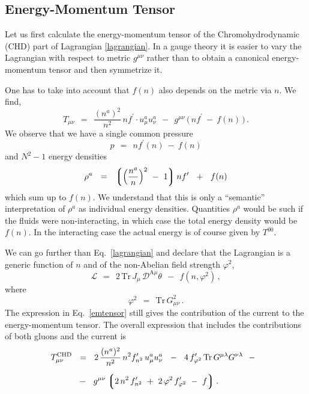\documentclass[epsfig,12pt]{article}
\def\beq{\begin{equation}}
\def\eeq{\end{equation}}
\newcommand{\md}{\mathcal{D}}
\newcommand{\ml}{\mathcal{L}}
\newcommand{\lgr}{\left\lgroup}
\newcommand{\rgr}{\right\rgroup}
\newcommand{\Tr}{\text{Tr}}
\begin{document}
\subsection{Energy-Momentum Tensor}
	Let us first calculate the energy-momentum tensor of the Chromohydrodynamic (CHD) part of Lagrangian \eqref{lagrangian}.
	In a gauge theory it is easier to vary the Lagrangian with respect to metric $ g^{\mu\nu} $ rather than to obtain
	a canonical energy-momentum tensor and then symmetrize it.

	One has to take into account that $ f(n) $ also depends on the metric via $ n $.
	We find,
\beq
\label{emtensor}
	T_{\mu\nu}    ~~=~~
				\frac{(n^a)^2}{n^2}\, n f^\prime \cdot u_\mu^a u_\nu^a  ~~-~~
				g^{\mu\nu}\, \big(\, n f^\prime ~-~ f(n) \,\big)\,.
\eeq
	We observe that we have a single common pressure
\beq
	p    ~~=~~    n f^\prime(n) ~-~ f(n)
\eeq
	and $ N^2 - 1 $ energy densities
\beq
	\rho^a    ~~=~~    \lgr \Big( \frac{n^a}{n} \Big)^2 ~-~ 1 \rgr n f^\prime  ~~+~~ f(n)
\eeq
	which sum up to $ f(n) $.
	We understand that this is only a ``semantic'' interpretation of $ \rho^a $ as individual energy densities.
	Quantities $ \rho^a $ would be such if the fluids were non-interacting, in which case
	the total energy density would be $ f(n) $.
	In the interacting case the actual energy is of course given by $ T^{00} $.

        We can go further than Eq.~\eqref{lagrangian} and declare that the Lagrangian
        is a generic function of $ n $ and of the non-Abelian field strength $ \varphi^2 $,
\beq
\label{generic}
        \ml    ~~=~~    2\, \Tr\, J_\mu\,  \md^{\text{A}\mu} \theta   ~~-~~  f(n, \varphi^2)\,,
\eeq
        where
\beq
        \varphi^2    ~~=~~    \Tr\, G_{\mu\nu}^2\,.
\eeq
	The expression in Eq.~\eqref{emtensor} still gives the contribution of the current to the energy-momentum tensor.
	The overall expression that includes the contributions of both gluons and the current is
\begin{align}
\notag
	T_{\mu\nu}^\text{CHD}   & 
			~~=~~
				2\, \frac{(n^a)^2}{n^2}\, n^2 f_{n^2}^\prime\, u_\mu^a u_\nu^a  ~~-~~
				4\, f_{\varphi^2}^\prime\, \Tr\, G^{\mu\lambda} G^{\nu\lambda}  ~~-~~
	\\[2mm]
\label{TCHD}
	& 
			~~-~~
				g^{\mu\nu} \lgr 2\, n^2\, f_{n^2}^\prime  ~+~  2\, \varphi^2\, f_{\varphi^2}^\prime  ~-~  f \rgr .
\end{align}
\end{document}
